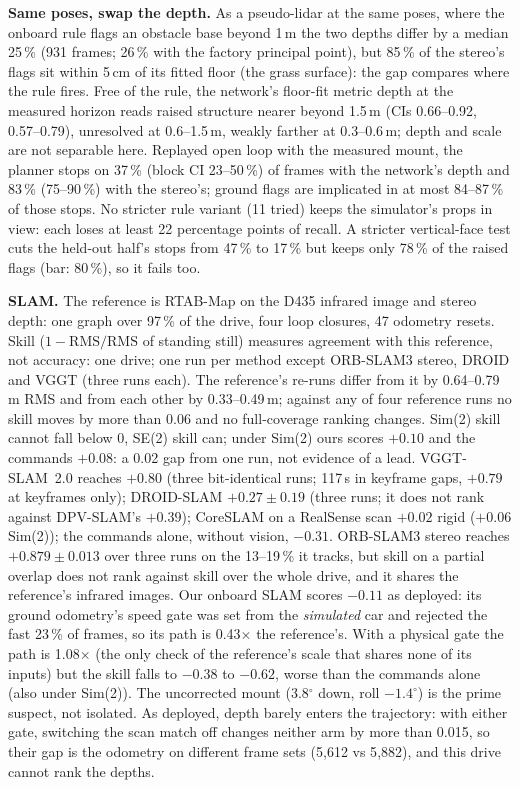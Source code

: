 \documentclass[conference]{IEEEtran}
\begin{document}
\textbf{Same poses, swap the depth.} As a pseudo-lidar at the same poses, where the onboard rule flags an obstacle base beyond
1\,m the two depths differ by a median 25\,\% (931 frames; 26\,\% with the factory principal point), but 85\,\%
of the stereo's flags sit within 5\,cm of its fitted floor (the grass surface): the gap compares where the rule fires. Free of
the rule, the network's floor-fit metric depth at the measured horizon reads raised structure nearer beyond 1.5\,m (CIs 0.66--0.92,
0.57--0.79), unresolved at 0.6--1.5\,m, weakly farther at 0.3--0.6\,m; depth and scale are not separable here. Replayed open loop with the measured mount, the planner
stops on 37\,\% (block CI 23--50\,\%) of frames with the network's depth and 83\,\% (75--90\,\%) with the stereo's; ground flags are implicated in at most 84--87\,\% of those stops. No stricter rule variant (11 tried) keeps the simulator's props in view: each loses at least 22 percentage points of recall. A stricter vertical-face test cuts the held-out half's stops from 47\,\% to 17\,\% but keeps only 78\,\% of the raised flags (bar: 80\,\%), so it fails too.

\textbf{SLAM.} The reference is RTAB-Map on the D435 infrared image and stereo depth: one graph over 97\,\% of the drive, four
loop closures, 47 odometry resets. Skill ($1-\mathrm{RMS}/\mathrm{RMS}$ of standing still) measures agreement with this
reference, not accuracy: one drive; one run per method except ORB-SLAM3 stereo, DROID and VGGT (three runs each). The
reference's re-runs differ from it by 0.64--0.79\,m RMS and from each other by 0.33--0.49\,m; against any of four reference runs no skill moves by more than 0.06 and no
full-coverage ranking changes. Sim(2) skill cannot fall below 0, SE(2) skill can;
under Sim(2) ours scores $+0.10$ and the commands $+0.08$: a 0.02 gap from one run, not evidence of a lead. VGGT-SLAM~2.0
reaches $+0.80$ (three bit-identical runs; 117\,s in keyframe gaps, $+0.79$ at keyframes only); DROID-SLAM $+0.27\pm0.19$ (three runs; it does not rank
against DPV-SLAM's $+0.39$); CoreSLAM on a RealSense scan $+0.02$ rigid ($+0.06$ Sim(2)); the commands alone, without
vision, $-0.31$. ORB-SLAM3 stereo reaches $+0.879\pm0.013$ over three runs on the 13--19\,\% it tracks, but skill on a partial overlap does not rank against
skill over the whole drive, and it shares the reference's infrared images. Our onboard SLAM scores $-0.11$ as deployed: its
ground odometry's speed gate was set from the \emph{simulated} car and rejected the fast 23\,\% of frames, so its path is
0.43$\times$ the reference's. With a physical gate the path is 1.08$\times$ (the only check of the reference's scale that
shares none of its inputs) but the skill falls to $-0.38$ to $-0.62$, worse than the commands alone (also under Sim(2)). The uncorrected mount (3.8$^\circ$ down,
roll $-1.4^\circ$) is the prime suspect, not isolated. As deployed, depth barely enters the trajectory:
with either gate, switching the scan match off changes neither arm by more than 0.015, so their gap is the odometry on different frame sets (5{,}612 vs 5{,}882), and this drive cannot rank the depths.
\end{document}
